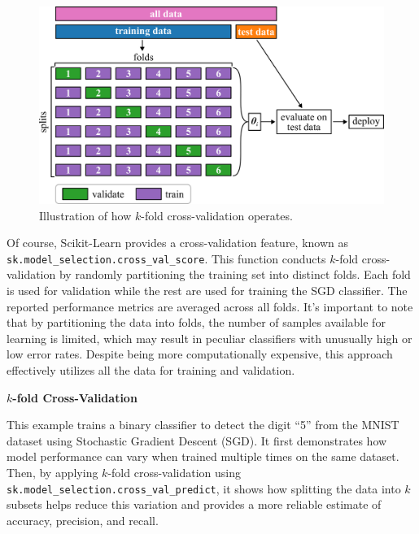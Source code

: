 \documentclass[12pt,letter]{article}
\begin{document}
\begin{figure}[H]
    \centering
    \includegraphics[]{../figures/grid_search_cross_validation.png}
    \caption{Illustration of how $k$-fold cross-validation operates.}
    \label{fig:grid_search_cross_validation}
\end{figure}

Of course, Scikit-Learn provides a cross-validation feature, known as \texttt{sk.model\_selection.\allowbreak cross\_val\_score}. This function conducts $k$-fold cross-validation by randomly partitioning the training set into distinct folds. Each fold is used for validation while the rest are used for training the SGD classifier. The reported performance metrics are averaged across all folds. It's important to note that by partitioning the data into folds, the number of samples available for learning is limited, which may result in peculiar classifiers with unusually high or low error rates. Despite being more computationally expensive, this approach effectively utilizes all the data for training and validation.





\begin{example}
\textbf{$k$-fold Cross-Validation}
 
\noindent This example trains a binary classifier to detect the digit ``5'' from the MNIST dataset using Stochastic Gradient Descent (SGD). It first demonstrates how model performance can vary when trained multiple times on the same dataset. Then, by applying $k$-fold cross-validation using \texttt{sk.model\_selection.cross\_val\_predict}, it shows how splitting the data into $k$ subsets helps reduce this variation and provides a more reliable estimate of accuracy, precision, and recall.
\end{example}
\end{document}
